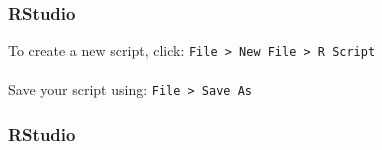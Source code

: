 \documentclass[color=usenames,dvipsnames]{beamer}\usepackage[]{graphicx}\usepackage[]{color}
\begin{document}
\begin{frame}
  \frametitle{RStudio}
  To create a new script, click: {\tt File > New File > R Script} \\
   \\
    Save your script using: {\tt File > Save As}
\end{frame}

\begin{frame}
  \frametitle{RStudio}
\end{frame}
\end{document}
